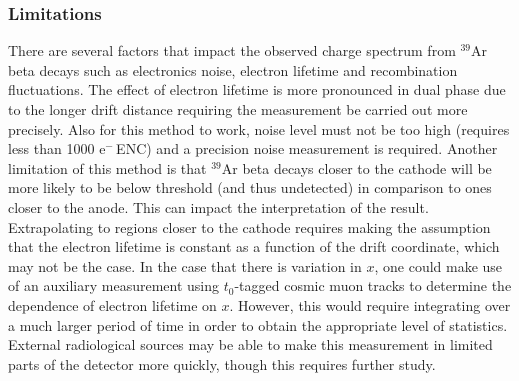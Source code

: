 \subsubsection{Limitations}
There are several factors that impact the observed charge spectrum from ${}^{39}$Ar beta decays such as electronics noise, electron lifetime and recombination fluctuations. The effect of electron lifetime is more pronounced in dual phase due to the longer drift distance requiring the measurement be carried out more precisely. Also for this method to work, noise level must not be too high (requires less than \num{1000} e$^{-}$\,ENC) and a precision noise measurement is required. Another limitation of this method is that ${}^{39}$Ar beta decays closer to the cathode will be more likely to be below threshold (and thus undetected) in comparison to ones closer to the anode. This can impact the interpretation of the result. Extrapolating to regions closer to the cathode requires making the assumption that the electron lifetime is constant as a function of the drift coordinate, which may not be the case. In the case that there is variation in $x$, one could make use of an auxiliary measurement using $t_{0}$-tagged cosmic muon tracks to determine the dependence of electron lifetime on $x$.  However, this would require integrating over a much larger period of time in order to obtain the appropriate level of statistics.  External radiological sources may be able to make this measurement in limited parts of the detector more quickly, though this requires further study.


